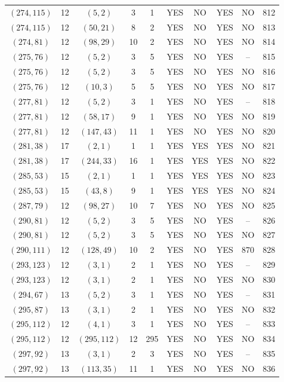 \begin{longtable}{|c|c|c|c|c|c|c|c|c|c|}
$(274, 115)$ & 12 & $(5, 2)$ & 3 & 1 & YES & NO & YES & NO & 812\\
$(274, 115)$ & 12 & $(50, 21)$ & 8 & 2 & YES & NO & YES & NO & 813\\
$(274, 81)$ & 12 & $(98, 29)$ & 10 & 2 & YES & NO & YES & NO & 814\\
$(275, 76)$ & 12 & $(5, 2)$ & 3 & 5 & YES & NO & YES & -- & 815\\
$(275, 76)$ & 12 & $(5, 2)$ & 3 & 5 & YES & NO & YES & NO & 816\\
$(275, 76)$ & 12 & $(10, 3)$ & 5 & 5 & YES & NO & YES & NO & 817\\
$(277, 81)$ & 12 & $(5, 2)$ & 3 & 1 & YES & NO & YES & -- & 818\\
$(277, 81)$ & 12 & $(58, 17)$ & 9 & 1 & YES & NO & YES & NO & 819\\
$(277, 81)$ & 12 & $(147, 43)$ & 11 & 1 & YES & NO & YES & NO & 820\\
$(281, 38)$ & 17 & $(2, 1)$ & 1 & 1 & YES & YES & YES & NO & 821\\
$(281, 38)$ & 17 & $(244, 33)$ & 16 & 1 & YES & YES & YES & NO & 822\\
$(285, 53)$ & 15 & $(2, 1)$ & 1 & 1 & YES & YES & YES & NO & 823\\
$(285, 53)$ & 15 & $(43, 8)$ & 9 & 1 & YES & YES & YES & NO & 824\\
$(287, 79)$ & 12 & $(98, 27)$ & 10 & 7 & YES & NO & YES & NO & 825\\
$(290, 81)$ & 12 & $(5, 2)$ & 3 & 5 & YES & NO & YES & -- & 826\\
$(290, 81)$ & 12 & $(5, 2)$ & 3 & 5 & YES & NO & YES & NO & 827\\
$(290, 111)$ & 12 & $(128, 49)$ & 10 & 2 & YES & NO & YES & 870 & 828\\
$(293, 123)$ & 12 & $(3, 1)$ & 2 & 1 & YES & NO & YES & -- & 829\\
$(293, 123)$ & 12 & $(3, 1)$ & 2 & 1 & YES & NO & YES & NO & 830\\
$(294, 67)$ & 13 & $(5, 2)$ & 3 & 1 & YES & NO & YES & -- & 831\\
$(295, 87)$ & 13 & $(3, 1)$ & 2 & 1 & YES & NO & YES & NO & 832\\
$(295, 112)$ & 12 & $(4, 1)$ & 3 & 1 & YES & NO & YES & -- & 833\\
$(295, 112)$ & 12 & $(295, 112)$ & 12 & 295 & YES & NO & YES & NO & 834\\
$(297, 92)$ & 13 & $(3, 1)$ & 2 & 3 & YES & NO & YES & -- & 835\\
$(297, 92)$ & 13 & $(113, 35)$ & 11 & 1 & YES & NO & YES & NO & 836\\

\end{longtable}

